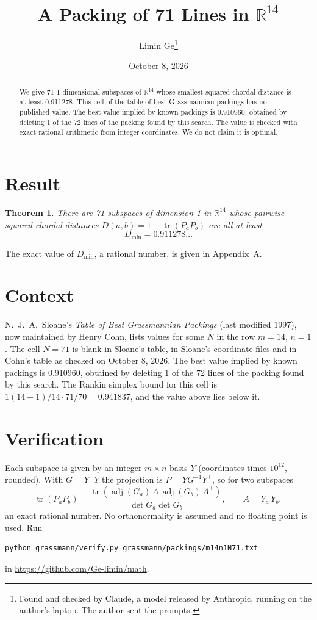 \documentclass[11pt,a4paper]{article}
\title{A Packing of 71 Lines in $\mathbb{R}^{14}$}
\author{Limin Ge\thanks{Found and checked by Claude, a model released by Anthropic, running on the author's laptop. The author sent the prompts.}}
\date{October 8, 2026}
\newtheorem*{theorem}{Theorem}
\begin{document}
\maketitle
\begin{abstract}
We give 71 1-dimensional subspaces of $\mathbb{R}^{14}$ whose smallest squared chordal distance is at least 0.911278. This cell of the table of best Grassmannian packings has no published value. The best value implied by known packings is 0.910960, obtained by deleting 1 of the 72 lines of the packing found by this search. The value is checked with exact rational arithmetic from integer coordinates. We do not claim it is optimal.
\end{abstract}

\section{Result}
\begin{theorem}
There are 71 subspaces of dimension 1 in $\mathbb{R}^{14}$ whose pairwise squared chordal distances $D(a,b) = 1 - \operatorname{tr}(P_aP_b)$ are all at least
\[ D_{\min} = 0.911278\ldots \]
\end{theorem}
The exact value of $D_{\min}$, a rational number, is given in Appendix~A.


\section{Context}
N.~J.~A.~Sloane's \emph{Table of Best Grassmannian Packings} (last modified 1997), now maintained by Henry Cohn, lists values for some $N$ in the row $m=14$, $n=1$. The cell $N=71$ is blank in Sloane's table, in Sloane's coordinate files and in Cohn's table as checked on October 8, 2026. The best value implied by known packings is 0.910960, obtained by deleting 1 of the 72 lines of the packing found by this search. The Rankin simplex bound for this cell is $1(14-1)/14\cdot 71/70 = 0.941837$, and the value above lies below it.


\section{Verification}
Each subspace is given by an integer $m\times n$ basis $Y$ (coordinates times $10^{12}$, rounded). With $G=Y^\top Y$ the projection is $P=YG^{-1}Y^\top$, so for two subspaces
\[ \operatorname{tr}(P_aP_b)=\frac{\operatorname{tr}(\operatorname{adj}(G_a)\,A\,\operatorname{adj}(G_b)\,A^\top)}{\det G_a\det G_b},\qquad A=Y_a^\top Y_b, \]
an exact rational number. No orthonormality is assumed and no floating point is used. Run
\begin{verbatim}
python grassmann/verify.py grassmann/packings/m14n1N71.txt
\end{verbatim}
in \url{https://github.com/Ge-limin/math}.
\end{document}
